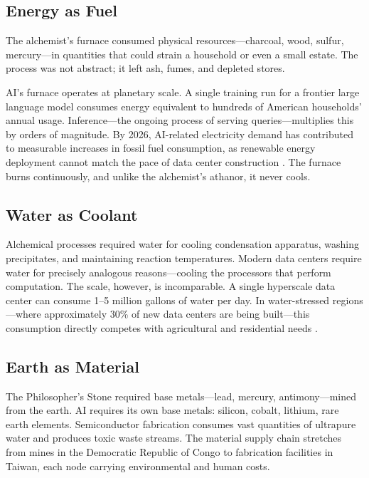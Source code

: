 \documentclass[12pt]{article}
\begin{document}
\subsection{Energy as Fuel}
\label{sec:energy}

The alchemist's furnace consumed physical resources---charcoal, wood, sulfur, mercury---in quantities that could strain a household or even a small estate. The process was not abstract; it left ash, fumes, and depleted stores.

AI's furnace operates at planetary scale. A single training run for a frontier large language model consumes energy equivalent to hundreds of American households' annual usage. Inference---the ongoing process of serving queries---multiplies this by orders of magnitude. By 2026, AI-related electricity demand has contributed to measurable increases in fossil fuel consumption, as renewable energy deployment cannot match the pace of data center construction \citep{iea2026}. The furnace burns continuously, and unlike the alchemist's athanor, it never cools.

\subsection{Water as Coolant}
\label{sec:water}

Alchemical processes required water for cooling condensation apparatus, washing precipitates, and maintaining reaction temperatures. Modern data centers require water for precisely analogous reasons---cooling the processors that perform computation. The scale, however, is incomparable. A single hyperscale data center can consume 1--5 million gallons of water per day. In water-stressed regions---where approximately 30\% of new data centers are being built---this consumption directly competes with agricultural and residential needs \citep{ploswater2024}.

\subsection{Earth as Material}
\label{sec:earth}

The Philosopher's Stone required base metals---lead, mercury, antimony---mined from the earth. AI requires its own base metals: silicon, cobalt, lithium, rare earth elements. Semiconductor fabrication consumes vast quantities of ultrapure water and produces toxic waste streams. The material supply chain stretches from mines in the Democratic Republic of Congo to fabrication facilities in Taiwan, each node carrying environmental and human costs.
\end{document}
